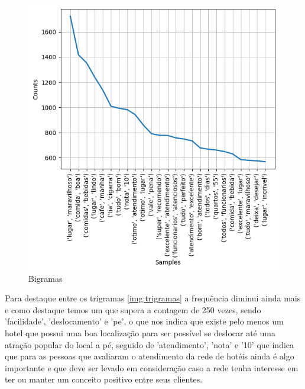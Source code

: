 \begin{figure}[!h]
	\centering
	\includegraphics[width=.8\textwidth]{figs/exploratoria/bigramas.png}
	\caption{Bigramas}
	\label{img:bigramas}
\end{figure}

Para destaque entre os trigramas \ref{img:trigramas} a frequência diminui ainda mais e como destaque temos um que supera a contagem de 250 vezes, sendo 'facilidade', 'deslocamento' e 'pe', o que nos indica que existe pelo menos um hotel que possui uma boa localização para ser possível se deslocar até uma atração popular do local a pé, seguido de 'atendimento', 'nota' e '10' que indica que para as pessoas que avaliaram o atendimento da rede de hotéis ainda é algo importante e que deve ser levado em consideração caso a rede tenha interesse em ter ou manter um conceito positivo entre seus clientes.

